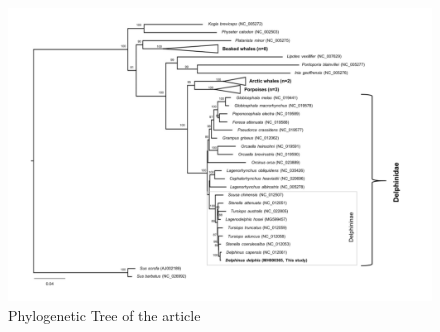 \documentclass[12pt]{article}
\begin{document}
\newpage
\begin{figure}
    \centering
    \includegraphics[scale = 0.55]{Delphinus_tree_1.png}
    \caption{Phylogenetic Tree of the article}
    \label{fig:theirPhy}
\end{figure}
\end{document}
